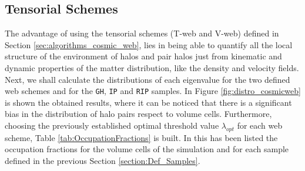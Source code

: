 \documentclass[usenatbib]{latex/mn2e}
\begin{document}
\subsection{Tensorial Schemes}
\label{subsec:tensorial_schemes}



The advantage of using the tensorial schemes (T-web and V-web) defined in
Section \ref{sec:algorithms_cosmic_web}, lies in being able to quantify
all the local structure of the environment of halos and pair halos just 
from kinematic and dynamic properties of the matter distribution, like the
density and velocity fields. Next, we shall calculate the distributions of 
each eigenvalue for the two defined web schemes and for the \texttt{GH}, 
\texttt{IP} and \texttt{RIP} samples. In Figure \ref{fig:distro_cosmicweb} 
is shown the obtained results, where it can be noticed that there is a 
significant bias in the distribution of halo pairs respect to volume cells. 
Furthermore, choosing the previously established optimal threshold value 
$\lambda_{opt}$ for each web scheme, Table \ref{tab:OccupationFractions} 
is built. In this has been listed the occupation fractions for the volume 
cells of the simulation and for each sample defined in the previous Section 
\ref{section:Def_Samples}.
\end{document}
